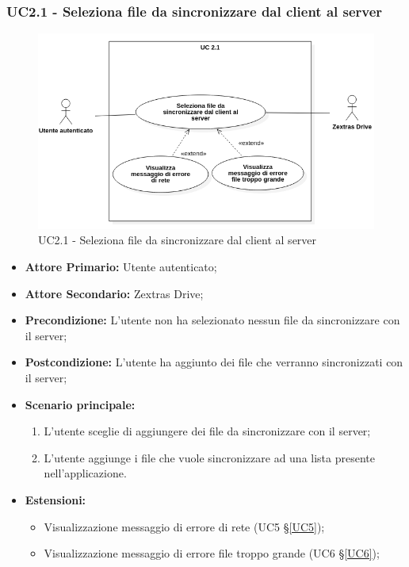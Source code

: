 \subsubsection{UC2.1 - Seleziona file da sincronizzare dal client al server}
\begin{figure}[H]
    \centering
    \includegraphics[scale = 0.7]{components/img/UC2_1.png}
    \caption{UC2.1 - Seleziona file da sincronizzare dal client al server}
\end{figure}
\begin{itemize}
\item \textbf{Attore Primario:} Utente autenticato;
\item \textbf{Attore Secondario:} Zextras Drive;
\item \textbf{Precondizione:} L'utente non ha selezionato nessun file da sincronizzare con il server;
\item \textbf{Postcondizione:} L'utente ha aggiunto dei file che verranno sincronizzati con il server;
\item \textbf{Scenario principale:}
    \begin{enumerate}
    \item L'utente sceglie di aggiungere dei file da sincronizzare con il server;
    \item L'utente aggiunge i file che vuole sincronizzare ad una lista presente nell'applicazione.
    \end{enumerate}
\item \textbf{Estensioni:}
    \begin{itemize}
    \item Visualizzazione messaggio di errore di rete (UC5 \S{}\ref{UC5});
    \item Visualizzazione messaggio di errore file troppo grande (UC6 \S{}\ref{UC6});
    \end{itemize}
\end{itemize}

